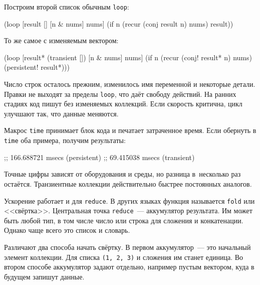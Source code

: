 
\noindent
Построим второй список обычным \verb|loop|:

\begin{english}
  \begin{clojure}
(loop [result []
       [n & nums] nums]
  (if n
    (recur (conj result n) nums)
    result))
  \end{clojure}
\end{english}

\noindent
То же самое с изменяемым вектором:

\begin{english}
  \begin{clojure}
(loop [result* (transient [])
       [n & nums] nums]
  (if n
    (recur (conj! result* n) nums)
    (persistent! result*)))
  \end{clojure}
\end{english}

Число строк осталось прежним, изменилось имя переменной и некоторые
детали. Правки не выходят за пределы \verb|loop|, что даёт свободу
действий. На ранних стадиях код пишут без изменяемых коллекций. Если скорость
критична, цикл улучшают так, что данные меняются.

Макрос \verb|time| принимает блок кода и печатает затраченное время. Если
обернуть в \verb|time| оба примера, получим результаты:

\begin{english}
  \begin{text}
;; 166.688721 msecs (persistent)
;;  69.415038 msecs (transient)
  \end{text}
\end{english}

Точные цифры зависят от оборудования и среды, но разница в~несколько раз
остаётся. Транзиентные коллекции действительно быстрее постоянных аналогов.


Ускорение работает и для \verb|reduce|. В других языках функция называется
\verb|fold| или <<свёртка>>. Центральная точка \verb|reduce|~---
аккумулятор результата. Им может быть любой тип, в том числе число или строка
для сложения и конкатенации. Однако чаще всего это список и словарь.

Различают два способа начать свёртку. В первом аккумулятор~--- это начальный
элемент коллекции. Для списка \verb|(1, 2, 3)| и сложения им станет
единица. Во втором способе аккумулятор задают отдельно, например пустым вектором, куда в
будущем запишут данные.

